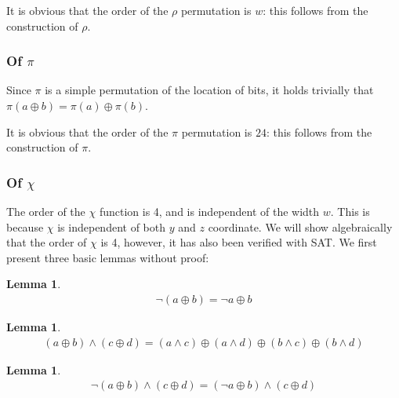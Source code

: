\documentclass[10pt,twocolumn,twoside]{pnas-new}
\newtheorem{lemma}[theorem]{Lemma}
\begin{document}
It is obvious that the order of the $\rho$ permutation is $w$: this follows
from the construction of $\rho$.

\subsubsection{Of $\pi$} \label{sec:p:p}


Since $\pi$ is a simple permutation of the location of bits, it holds trivially
that $\pi(a \oplus b) = \pi(a) \oplus \pi(b)$.

It is obvious that the order of the $\pi$ permutation is $24$: this follows
from the construction of $\pi$.

\subsubsection{Of $\chi$} \label{sec:p:c}


The order of the $\chi$ function is 4, and is independent of the width
$w$. This is because $\chi$ is independent of both $y$ and $z$ coordinate.
We will show algebraically that the order of $\chi$ is 4, however, it has also
been verified with SAT. We first present three basic lemmas without proof:

\begin{lemma} \label{lem:p:c:1}
\begin{align*}
    \lnot(a \oplus b) = \lnot a \oplus b
\end{align*}
\end{lemma}

\begin{lemma} \label{lem:p:c:2}
\begin{align*}
    (a \oplus b) \land (c \oplus d) = (a \land c) \oplus (a \land d) \oplus (b \land c) \oplus (b \land d)
\end{align*}
\end{lemma}

\begin{lemma} \label{lem:p:c:3}
\begin{align*}
    \lnot(a \oplus b) \land (c \oplus d) = (\lnot a \oplus b) \land (c \oplus d)
\end{align*}
\end{lemma}
\end{document}
